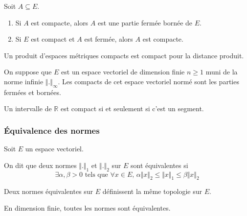   \begin{proposition}
    Soit $A \subseteq E$.
    \begin{enumerate}[label=(\roman*)]
      \item Si $A$ est compacte, alors $A$ est une partie fermée bornée de $E$.
      \item Si $E$ est compact et $A$ est fermée, alors $A$ est compacte.
    \end{enumerate}
  \end{proposition}

  \begin{proposition}
    Un produit d'espaces métriques compacts est compact pour la distance produit.
  \end{proposition}

  \begin{proposition}
    On suppose que $E$ est un espace vectoriel de dimension finie $n \geq 1$ muni de la norme infinie $\Vert . \Vert_\infty$. Les compacts de cet espace vectoriel normé sont les parties fermées et bornées.
  \end{proposition}

  \begin{application}
    Un intervalle de $\mathbb{R}$ est compact si et seulement si c'est un segment.
  \end{application}

  \subsubsection{Équivalence des normes}


  Soit $E$ un espace vectoriel.

  \begin{definition}
    On dit que deux normes $\Vert . \Vert_1$ et $\Vert . \Vert_2$ sur $E$ sont équivalentes si
    \[ \exists \alpha, \beta > 0 \text{ tels que } \forall x \in E, \, \alpha \Vert x \Vert_2 \leq \Vert x \Vert_1 \leq \beta \Vert x \Vert_2 \]
  \end{definition}

  \begin{remark}
    Deux normes équivalentes sur $E$ définissent la même topologie sur $E$.
  \end{remark}
  

  \begin{theorem}
    En dimension finie, toutes les normes sont équivalentes.
  \end{theorem}


